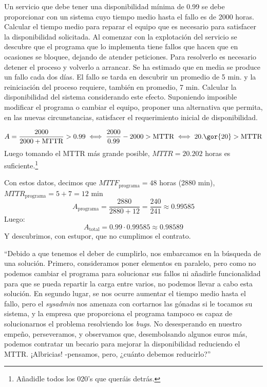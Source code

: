 \begin{problem}[6]
Un servicio que debe tener una disponibilidad mínima de 0.99 se debe proporcionar con un sistema cuyo tiempo medio hasta el fallo es de 2000 horas.
\ppart
Calcular el tiempo medio para reparar el equipo que es necesario para satisfacer la disponibilidad solicitada.
\ppart
Al comenzar con la explotación del servicio se descubre que el programa que lo implementa tiene fallos que hacen que en ocasiones se bloquee, dejando de atender peticiones. Para resolverlo es necesario detener el proceso y volverlo a arrancar. Se ha estimado que en media se produce un fallo cada dos días. El fallo se tarda en descubrir un promedio de 5 min. y la reiniciación del proceso requiere, también en promedio, 7 min. Calcular la disponibilidad del sistema considerando este efecto.
\ppart
Suponiendo imposible modificar el programa o cambiar el equipo, proponer una alternativa que permita, en las nuevas circunstancias, satisfacer el requerimiento inicial de disponibilidad.

\solution

\spart
\[ A = \frac{2000}{2000+\text{MTTR}} > 0.99 \iff \frac{2000}{0.99} - 2000 > \text{MTTR} \iff 20.\gor{20} > \text{MTTR} \]
Luego tomando el MTTR más grande posible, $MTTR = 20.202$ horas es suficiente.\footnote{Añadidle todos los 020's que queráis detrás.}

\spart
Con estos datos, decimos que $MTTF_{\text{programa}} = 48$ horas (2880 min), $MTTR_{\text{programa}} = 5+7 = 12$ min
\[ A_{\text{programa}} = \frac{2880}{2880+12} = \frac{240}{241} \approx 0.99585\]
Luego:
\[ A_{\text{total}} = 0.99 \cdot 0.99585 \approx 0.98589 \]
Y descubrimos, con estupor, que no cumplimos el contrato.

\spart
``Debido a que tenemos el deber de cumplirlo, nos embarcamos en la búsqueda de una solución.
Primero, consideramos poner elementos en paralelo, pero como no podemos cambiar el programa para solucionar sus fallos ni añadirle funcionalidad para que se pueda repartir la carga entre varios, no podemos llevar a cabo esta solución. En segundo lugar, se nos ocurre aumentar el tiempo medio hasta el fallo, pero el \textit{sysadmin} nos amenaza con cortarnos las gónadas si le tocamos su sistema, y la empresa que proporciona el programa tampoco es capaz de solucionarnos el problema resolviendo los \textit{bugs}. No desesperando en nuestro empeño, perseveramos, y observamos que, desembolsando algunos euros más, podemos contratar un becario para mejorar la disponibilidad reduciendo el MTTR. ¡Albricias! -pensamos, pero, ¿cuánto debemos reducirlo?''\\


\end{problem}
